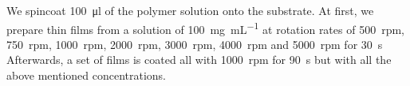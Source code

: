 
We spincoat \SI{100}{\micro\litre} of the polymer solution onto the substrate.
At first, we prepare thin films from a solution of \SI{100}{\milli\gram\per\milli\liter} at rotation rates of
\SI{500}{rpm}, \SI{750}{rpm}, \SI{1000}{rpm}, \SI{2000}{rpm}, \SI{3000}{rpm}, \SI{4000}{rpm} and \SI{5000}{rpm} for \SI{30}{\second}
Afterwards, a set of films is coated all with \SI{1000}{rpm} for \SI[]{90}{\second} but with all the above mentioned concentrations.